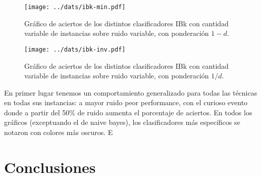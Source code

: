 \documentclass[a4paper,10pt]{article}
\begin{document}
\begin{figure}[h]
\centering
\texttt{[image: ../dats/ibk-min.pdf]}
\caption{Gráfico de aciertos de los distintos clasificadores \textsf{IBk} con cantidad variable de instancias sobre ruido variable, con ponderación $1-d$.}\label{fig:ibk-min}
\end{figure}

\begin{figure}[h]
\centering
\texttt{[image: ../dats/ibk-inv.pdf]}
\caption{Gráfico de aciertos de los distintos clasificadores \textsf{IBk} con cantidad variable de instancias sobre ruido variable, con ponderación $1/d$.}\label{fig:ibk-inv}
\end{figure}

En primer lugar tenemos un comportamiento generalizado para todas las técnicas en todas sus instancias: a mayor ruido peor performance, con el curioso evento donde a partir del 50\% de ruido aumenta el porcentaje de aciertos. En todos los gráficos (exceptuando el de \textsf{naive bayes}), los clasificadores más específicos se notaron con colores más oscuros. E

\section{Conclusiones}
\end{document}
